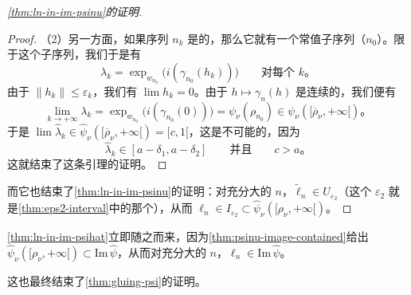 \begin{proof}[\cref{thm:ln-in-im-psinu}的证明]
\begin{proof}
（2）另一方面，如果序列 $n_{k}$ 是\trBounded{}的，那么它就有一个常值子序列（$n_{0}$）。限于这个子序列，我们于是有
\[
\lambda_{k}=\exp_{w_{n_{0}}}\bigl(i(\gamma_{n_{0}}(h_{k}))\bigr)\qquad\text{对每个 } k\text{。}
\]
由于 $\|h_{k}\|\le\varepsilon_{k}$，我们有 $\lim h_{k}=0$。由于 $h\mapsto\gamma_{n}(h)$ 是连续的，我们便有
\[
\lim_{k\to+\infty}\lambda_{k}=\exp_{w_{n_{0}}}\bigl(i(\gamma_{n_{0}}(0))\bigr)=\psi_{\nu}(\rho_{n_{0}})\in\psi_{\nu}([\overline{\rho}_{\nu},+\infty[)\text{。}
\]
于是 $\lim\widehat{\lambda}_{k}\in\widehat{\psi}_{\nu}([\overline{\rho}_{\nu},+\infty[)=[c,1[$，这是不可能的，因为
\[
\widehat{\lambda}_{k}\in[a-\delta_{1},a-\delta_{2}]\qquad\text{并且}\qquad c>a\text{。}
\]
这就结束了这条引理的证明。
\end{proof}

而它也结束了\cref{thm:ln-in-im-psinu}的证明：对充分大的 $n$，$\widetilde{\ell}_{n}\in U_{\varepsilon_{2}}$（这个 $\varepsilon_{2}$ 就是\cref{thm:eps2-interval}中的那个），从而 $\ell_{n}\in I_{\varepsilon_{2}}\subset\widehat{\psi}_{\nu}([\rho_{\nu},+\infty[)$。
\end{proof}

\cref{thm:ln-in-im-psihat}立即随之而来，因为\cref{thm:psinu-image-contained}给出 $\widehat{\psi}_{\nu}([\rho_{\nu},+\infty[)\subset\mathrm{Im}\,\widehat{\psi}$，从而对充分大的 $n$，$\ell_{n}\in\mathrm{Im}\,\widehat{\psi}$。\noqed

这也最终结束了\cref{thm:gluing-psi}的证明。

